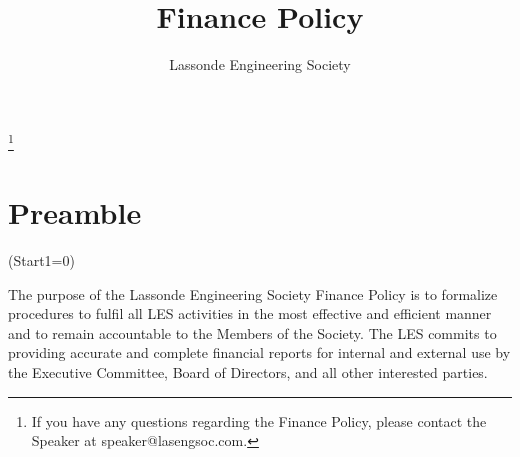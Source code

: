 \documentclass[10pt]{article}
\title{Finance Policy}
\author{Lassonde Engineering Society}
\date{}
\begin{document}
\pagebreak

\tableofcontents\let\thefootnote\relax\footnote{{If you have any questions regarding the Finance Policy, please contact the Speaker at speaker@lasengsoc.com.}}
\clearpage

\setcounter{page}{1}

\section{Preamble}
\vspace{5mm} %
\ListProperties(Start1=0)
\begin{easylist}
The purpose of the Lassonde Engineering Society Finance Policy is to formalize procedures to fulfil all LES activities in the most effective and efficient manner and to remain accountable to the Members of the Society. The LES commits to providing accurate and complete financial reports for internal and external use by the Executive Committee, Board of Directors, and all other interested parties.
\end{easylist}
\end{document}
